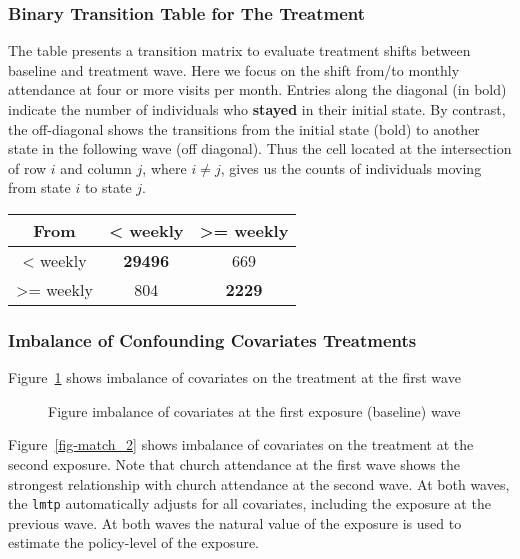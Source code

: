 \documentclass[
  singlecolumn]{article}
\begin{document}
\subsubsection{Binary Transition Table for The
Treatment}\label{binary-transition-table-for-the-treatment}

The table presents a transition matrix to evaluate treatment shifts
between baseline and treatment wave. Here we focus on the shift from/to
monthly attendance at four or more visits per month. Entries along the
diagonal (in bold) indicate the number of individuals who
\textbf{stayed} in their initial state. By contrast, the off-diagonal
shows the transitions from the initial state (bold) to another state in
the following wave (off diagonal). Thus the cell located at the
intersection of row \(i\) and column \(j\), where \(i \neq j\), gives us
the counts of individuals moving from state \(i\) to state \(j\).

\begin{longtable}[]{@{}ccc@{}}
\toprule\noalign{}
From & \textless{} weekly & \textgreater= weekly \\
\midrule\noalign{}
\endhead
\bottomrule\noalign{}
\endlastfoot
\textless{} weekly & \textbf{29496} & 669 \\
\textgreater= weekly & 804 & \textbf{2229} \\
\end{longtable}

\subsubsection{Imbalance of Confounding Covariates
Treatments}\label{imbalance-of-confounding-covariates-treatments}

Figure~\ref{fig-match_1} shows imbalance of covariates on the treatment
at the first wave

\begin{figure}


\caption{\label{fig-match_1}Figure imbalance of covariates at the first
exposure (baseline) wave}

\end{figure}%

Figure~\ref{fig-match_2} shows imbalance of covariates on the treatment
at the second exposure. Note that church attendance at the first wave
shows the strongest relationship with church attendance at the second
wave. At both waves, the \texttt{lmtp} automatically adjusts for all
covariates, including the exposure at the previous wave. At both waves
the natural value of the exposure is used to estimate the policy-level
of the exposure.
\end{document}
